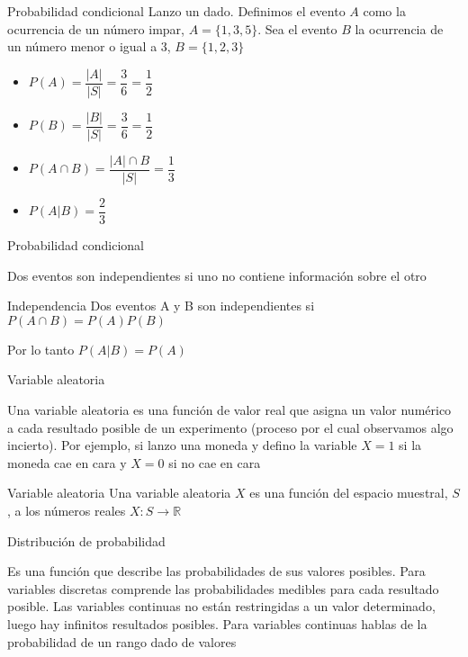 \documentclass{beamer}
\begin{document}
\begin{frame}{Probabilidad condicional}
    Lanzo un dado. Definimos el evento $A$ como la ocurrencia de un número impar, $A=\{1,3,5\}$. Sea el evento $B$ la ocurrencia de un número menor o igual a 3, $B=\{1,2,3\}$

    \begin{itemize}
        \item $P(A)=\dfrac{|A|}{|S|}=\dfrac{3}{6}=\dfrac{1}{2}$
        \item $P(B)=\dfrac{|B|}{|S|}=\dfrac{3}{6}=\dfrac{1}{2}$
        \item $P(A\cap B)=\dfrac{|A|\cap B}{|S|}=\dfrac{1}{3}$
        \item $P(A|B)=\dfrac{2}{3}$
    \end{itemize}
\end{frame}

\begin{frame}{Probabilidad condicional}

Dos eventos son independientes si uno no contiene información sobre el otro
\vspace{2mm}
\begin{block}{Independencia}
Dos eventos A y B son independientes si $P(A\cap B)=P(A)P(B)$
\end{block}

Por lo tanto $P(A|B)=P(A)$
  
\end{frame}

\begin{frame}{Variable aleatoria}

Una variable aleatoria es una función de valor real que asigna un valor numérico a cada resultado posible de un experimento (proceso por el cual observamos algo incierto). Por ejemplo, si lanzo una moneda y defino la variable $X=1$ si la moneda cae en cara y $X=0$ si no cae en cara

\vspace{2mm}

\begin{block}{Variable aleatoria}
Una variable aleatoria $X$ es una función del espacio muestral, $S$, a los números reales
$X:S\rightarrow \mathbb{R}$
    
\end{block}
    
\end{frame}

\begin{frame}{Distribución de probabilidad}

Es una función que describe las probabilidades de sus valores posibles. Para variables discretas comprende las probabilidades medibles para cada resultado posible. Las variables continuas no están restringidas a un valor determinado, luego hay infinitos resultados posibles. Para variables continuas hablas de la probabilidad de un rango dado de valores
    
\end{frame}
\end{document}
